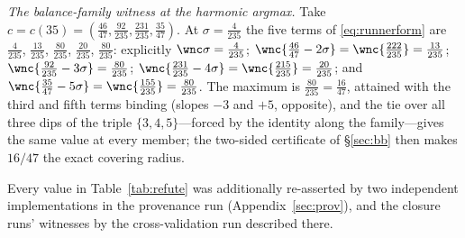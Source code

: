 \emph{The balance-family witness at the harmonic argmax.} Take
$c=c(35)=(\tfrac{46}{47},\tfrac{92}{235},\tfrac{231}{235},
\tfrac{35}{47})$. At $\sigma=\tfrac{4}{235}$ the five terms of
\eqref{eq:runnerform} are $\tfrac{4}{235}$, $\tfrac{13}{235}$,
$\tfrac{80}{235}$, $\tfrac{20}{235}$, $\tfrac{80}{235}$: explicitly
$\wnc\sigma=\tfrac4{235}$;
$\wnc{\tfrac{46}{47}-2\sigma}=\wnc{\tfrac{222}{235}}=\tfrac{13}{235}$;
$\wnc{\tfrac{92}{235}-3\sigma}=\tfrac{80}{235}$;
$\wnc{\tfrac{231}{235}-4\sigma}=\wnc{\tfrac{215}{235}}=\tfrac{20}{235}$;
and $\wnc{\tfrac{35}{47}-5\sigma}=\wnc{\tfrac{155}{235}}=\tfrac{80}{235}$.
The maximum is $\tfrac{80}{235}=\tfrac{16}{47}$, attained with the
third and fifth terms binding (slopes $-3$ and $+5$, opposite), and the
tie over all three dips of the triple $\{3,4,5\}$---forced by the
identity along the family---gives the same value at every member; the
two-sided certificate of \S\ref{sec:bb} then makes $16/47$ the exact
covering radius.

Every value in
Table~\ref{tab:refute} was additionally re-asserted by two independent
implementations in the provenance run (Appendix~\ref{sec:prov}), and
the closure runs' witnesses by the cross-validation run described
there.
